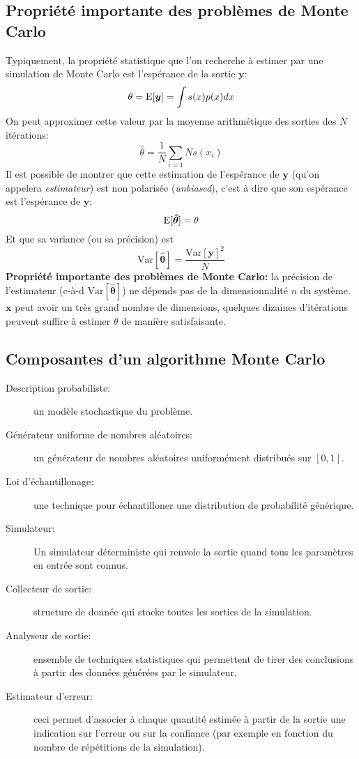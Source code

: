 \documentclass[a4paper]{article}
\begin{document}
\subsection{Propriété importante des problèmes de Monte Carlo}
Typiquement, la propriété statistique que l'on recherche à estimer par une
simulation de Monte Carlo est l'espérance de la sortie \(\bm y\):
\[\theta=\textrm E[\bm y]=\int s(x)p(x)dx\]
On peut approximer cette valeur par la moyenne arithmétique des sorties des
\(N\) itérations:
\[\hat\theta=\frac{1}{N}\sum_{i=1}{N}s(x_i)\]
Il est possible de montrer que cette estimation de l'espérance de \(\bm y\)
(qu'on appelera \emph{estimateur}) est non polarisée (\emph{unbiased}), c'est à
dire que son espérance est l'espérance de \(\bm y\):
\[\textrm E[\bm{\hat\theta}]=\theta\]
Et que sa variance (ou sa précision) est
\[\textrm{Var}[\bm{\hat\theta}]=\frac{\textrm{Var}[\bm y]^2}{N}\]
\textbf{Propriété importante des problèmes de Monte Carlo:} la précision de
l'estimateur (c-à-d \(\textrm{Var}[\bm{\hat\theta}]\)) ne dépends pas de la
dimensionnalité \(n\) du système. \(\mathbf x\) peut avoir un très grand
nombre de dimensions, quelques dizaines d'itérations peuvent suffire à estimer
\(\theta\) de manière satisfaisante.

\subsection{Composantes d'un algorithme Monte Carlo}
\begin{description}
	\item[Description probabiliste:] un modèle stochastique du problème.
	\item[Générateur uniforme de nombres aléatoires:]un générateur de
		nombres aléatoires uniformément distribués sur \([0,1]\).
	\item[Loi d'échantillonage:]une technique pour échantilloner une
		distribution de probabilité générique.
	\item[Simulateur:]Un simulateur déterministe qui renvoie la sortie
		quand tous les paramètres en entrée sont connus.
	\item[Collecteur de sortie:]structure de donnée qui stocke toutes
		les sorties de la simulation.
	\item[Analyseur de sortie:]ensemble de techniques statistiques qui
		permettent de tirer des conclusions à partir des données
		générées par le simulateur.
	\item[Estimateur d'erreur:]ceci permet d'associer à chaque quantité
		estimée à partir de la sortie une indication sur l'erreur ou sur
		la confiance (par exemple en fonction du nombre de répétitions
		de la simulation).
\end{description}
\end{document}
